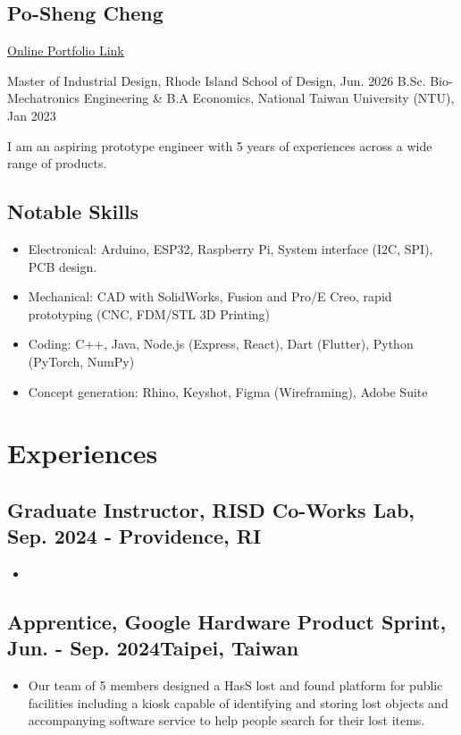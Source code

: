 \documentclass[12pt]{article}
\begin{document}
\begin{multicols}{2}
    \section*{Po-Sheng Cheng}
    \href{https://bencer3283.github.io/art/}{\underline{Online Portfolio Link}}
    
    \columnbreak
    {\sffamily \small \noindent
    Master of Industrial Design, Rhode Island School of Design, Jun. 2026 \newline
    B.Sc. Bio-Mechatronics Engineering \& \newline B.A Economics, National Taiwan University (NTU), Jan 2023
    }
\end{multicols}
{\small \noindent I am an aspiring prototype engineer with 5 years of experiences across a wide range of products.}
\subsection*{Notable Skills}
{ \small \begin{itemize}
    \item Electronical: Arduino, ESP32, Raspberry Pi, System interface (I2C, SPI), PCB design.
    \item Mechanical: CAD with SolidWorks, Fusion and Pro/E Creo, rapid prototyping (CNC, FDM/STL 3D Printing)
    \item Coding: C++, Java, Node.js (Express, React), Dart (Flutter), Python (PyTorch, NumPy)
    \item Concept generation: Rhino, Keyshot, Figma (Wireframing), Adobe Suite
\end{itemize}}
    \section*{Experiences}
    \subsection*{Graduate Instructor, RISD Co-Works Lab, Sep. 2024 -  \hfill Providence, RI}
        {\sffamily
        \begin{itemize}
            \item 
        \end{itemize}
        }
    \subsection*{Apprentice, Google Hardware Product Sprint, Jun. - Sep. 2024\hfill Taipei, Taiwan}
        { \small
        \begin{itemize}
            \item Our team of 5 members designed a HasS lost and found platform for public facilities including a kiosk capable of identifying and storing lost objects and accompanying software service to help people search for their lost items.
        \end{itemize}
        }
\end{document}
